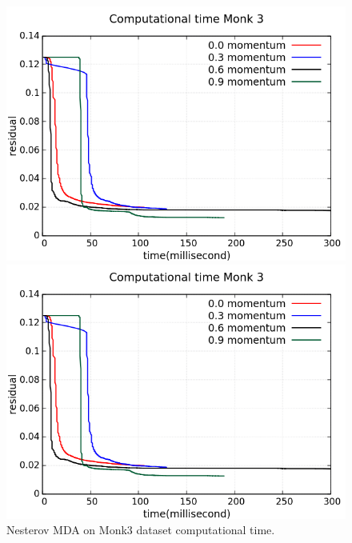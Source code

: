\begin{figure}[H]
	\centering
	\begin{minipage}[t]{0.5\linewidth}
		\includegraphics[width=\linewidth]{data/MGD/Monk3/NM/Monk3_NMGD_CT_standard.png}
	\end{minipage}%
	\begin{minipage}[t]{0.5\linewidth}
		\includegraphics[width=\linewidth]{data/MGD/Monk3/NM/Monk3_NMGD_CT_zoom.png}
	\end{minipage}
	\caption{Nesterov MDA on Monk3 dataset computational time.}
\end{figure}
